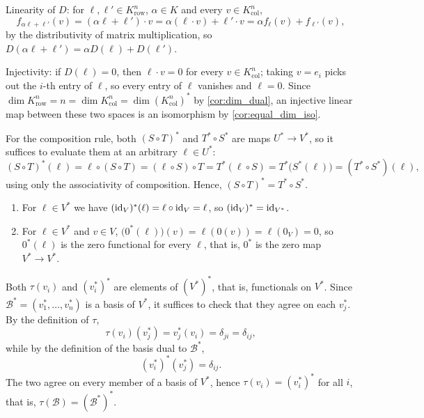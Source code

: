 \begin{exercisesolution}
\label{sol:row_space_is_dual}
Linearity of $D$: for $\ell, \ell' \in K^n_{\text{row}}$, $\alpha \in K$ and every $v \in K^n_{\text{col}}$,
\[
f_{\alpha \ell + \ell'}(v) = (\alpha \ell + \ell') \cdot v = \alpha (\ell \cdot v) + \ell' \cdot v = \alpha f_{\ell}(v) + f_{\ell'}(v),
\]
by the distributivity of matrix multiplication, so $D(\alpha \ell + \ell') = \alpha D(\ell) + D(\ell')$.

Injectivity: if $D(\ell) = 0$, then $\ell \cdot v = 0$ for every $v \in K^n_{\text{col}}$; taking $v = e_i$ picks out the $i$-th entry of $\ell$, so every entry of $\ell$ vanishes and $\ell = 0$. Since $\dim K^n_{\text{row}} = n = \dim K^n_{\text{col}} = \dim (K^n_{\text{col}})^*$ by \cref{cor:dim_dual}, an injective linear map between these two spaces is an isomorphism by \cref{cor:equal_dim_iso}.
\end{exercisesolution}

\begin{exercisesolution}
\label{sol:dual_functoriality}
For the composition rule, both $(S \circ T)^*$ and $T^* \circ S^*$ are maps $U^* \to V^*$, so it suffices to evaluate them at an arbitrary $\ell \in U^*$:
\[
(S \circ T)^*(\ell) = \ell \circ (S \circ T) = (\ell \circ S) \circ T = T^*(\ell \circ S) = T^*\big(S^*(\ell)\big) = (T^* \circ S^*)(\ell),
\]
using only the associativity of composition. Hence, $(S \circ T)^* = T^* \circ S^*$.

\begin{enumerate}[label=\textbf{(\alph*)}]
    \item For $\ell \in V^*$ we have $(\operatorname{id}_V)^*(\ell) = \ell \circ \operatorname{id}_V = \ell$, so $(\operatorname{id}_V)^* = \operatorname{id}_{V^*}$.
    \item For $\ell \in V^*$ and $v \in V$, $\big(0^*(\ell)\big)(v) = \ell(0(v)) = \ell(0_V) = 0$, so $0^*(\ell)$ is the zero functional for every $\ell$, that is, $0^*$ is the zero map $V^* \to V^*$. \qedhere
\end{enumerate}
\end{exercisesolution}

\begin{exercisesolution}
\label{sol:tau_on_dual_bases}
Both $\tau(v_i)$ and $(v_i^*)^*$ are elements of $(V^*)^*$, that is, functionals on $V^*$. Since $\mathcal{B}^* = (v_1^*, \dots, v_n^*)$ is a basis of $V^*$, it suffices to check that they agree on each $v_j^*$. By the definition of $\tau$,
\[
\tau(v_i)(v_j^*) = v_j^*(v_i) = \delta_{ji} = \delta_{ij},
\]
while by the definition of the basis dual to $\mathcal{B}^*$,
\[
(v_i^*)^*(v_j^*) = \delta_{ij}.
\]
The two agree on every member of a basis of $V^*$, hence $\tau(v_i) = (v_i^*)^*$ for all $i$, that is, $\tau(\mathcal{B}) = (\mathcal{B}^*)^*$.
\end{exercisesolution}

